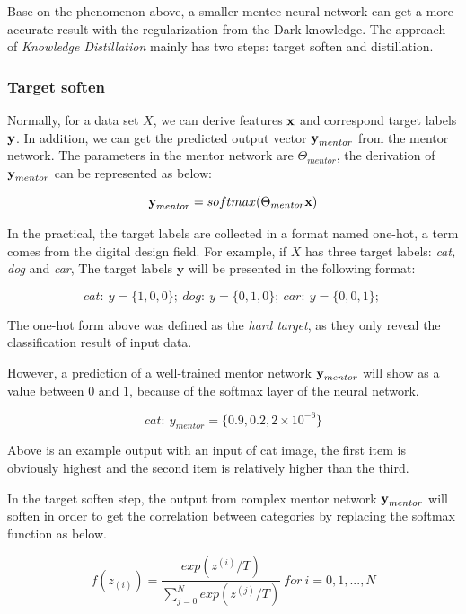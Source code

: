 \documentclass[article]{aaltoseries}
\begin{document}
Base on the phenomenon above, a smaller mentee neural network can get a more accurate result with the regularization from
the Dark knowledge. 
The approach of \emph{Knowledge Distillation} mainly has two steps: target soften and distillation.

\subsubsection{Target soften}

Normally, for a data set \(X\), we can derive features \(\textbf x \) and correspond target labels \(\textbf y\).
In addition, we can get the predicted output vector \(\textbf y_{mentor}\) from the mentor network.
The parameters in the mentor network are \(\Theta_{mentor}\), 
the derivation of \(\textbf y_{mentor}\) can be represented as below:

\[
  \textbf y_{mentor} = softmax(\Theta_{mentor} \textbf{x})
\]

In the practical, the target labels are collected in a format named one-hot, a term comes from the digital
design field\cite{DigitalDesign}. For example, if \(X\) has three target labels: \emph{cat, dog} and \emph{car},
The target labels \(\textbf{y}\) will be presented in the following format:

\[
  cat:\ y = \{1,0,0\};\ 
  dog:\ y = \{0,1,0\};\ 
  car:\ y = \{0,0,1\};\ 
\]

The one-hot form above was defined as the \emph{hard target}, as they only reveal the classification result of input data.

However, a prediction of a well-trained mentor network \(\textbf y_{mentor}\) will show as a value between 
\(0\) and \(1\), because of the softmax layer of the neural network. 

\begin{equation} \label{eq:cat_example}
  cat:\ y_{mentor} = \{0.9,0.2,2 \times 10^{-6}\}
\end{equation}

Above is an example output with an input of cat image, 
the first item is obviously highest and the second item is relatively higher than the third.


In the target soften step, 
the output from complex mentor network \(\textbf y_{mentor}\) will soften in order to get the correlation between categories
by replacing the softmax function as below.

\begin{equation} \label{eq:new_soft_max}
  f(z_{(i)}) = \frac{exp(z^{(i)}/T)}{\sum_{j=0}^{N}exp(z^{(j)}/T)}\ for\ i=0,1,...,N
\end{equation}
\end{document}
